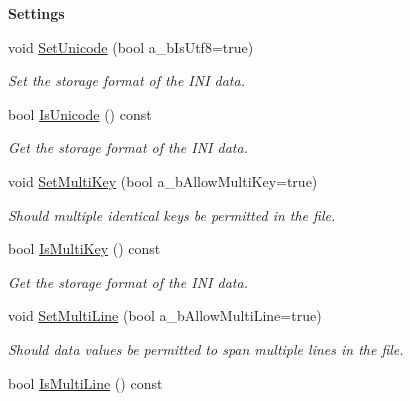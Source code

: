 \begin{Indent}{\bf Settings}\par
\begin{DoxyCompactItemize}
\item 
void \hyperlink{class_c_simple_ini_templ_aa9a15a66de893571014f661f89cb4d4b}{Set\+Unicode} (bool a\+\_\+b\+Is\+Utf8=true)
\begin{DoxyCompactList}\small\item\em Set the storage format of the I\+NI data. \end{DoxyCompactList}\item 
bool \hyperlink{class_c_simple_ini_templ_aa18f29d67107392a9e9f361def892c71}{Is\+Unicode} () const 
\begin{DoxyCompactList}\small\item\em Get the storage format of the I\+NI data. \end{DoxyCompactList}\item 
void \hyperlink{class_c_simple_ini_templ_ac3cfaf072a64f960bdcb7ddf2edc52b6}{Set\+Multi\+Key} (bool a\+\_\+b\+Allow\+Multi\+Key=true)
\begin{DoxyCompactList}\small\item\em Should multiple identical keys be permitted in the file. \end{DoxyCompactList}\item 
bool \hyperlink{class_c_simple_ini_templ_a8069b3c574949b78fe0274ae803f0685}{Is\+Multi\+Key} () const 
\begin{DoxyCompactList}\small\item\em Get the storage format of the I\+NI data. \end{DoxyCompactList}\item 
void \hyperlink{class_c_simple_ini_templ_aa7214b76600790053a5c715e9730aab0}{Set\+Multi\+Line} (bool a\+\_\+b\+Allow\+Multi\+Line=true)
\begin{DoxyCompactList}\small\item\em Should data values be permitted to span multiple lines in the file. \end{DoxyCompactList}\item 
bool \hyperlink{class_c_simple_ini_templ_a805dba3689efd63f8c4485a5f2e89090}{Is\+Multi\+Line} () const \hypertarget{class_c_simple_ini_templ_a805dba3689efd63f8c4485a5f2e89090}{}\label{class_c_simple_ini_templ_a805dba3689efd63f8c4485a5f2e89090}


\end{DoxyCompactItemize}
\end{Indent}
